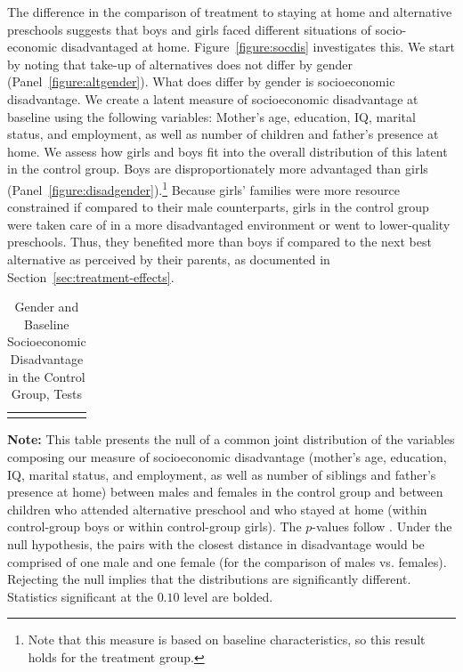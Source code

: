 The difference in the comparison of treatment to staying at home and alternative preschools suggests that boys and girls faced different situations of socio-economic disadvantaged at home. Figure~\ref{figure:socdis} investigates this. We start by noting that take-up of alternatives does not differ by gender (Panel~\ref{figure:altgender}). What does differ by gender is socioeconomic disadvantage. We create a latent measure of socioeconomic disadvantage at baseline using the following variables: Mother's age, education, IQ, marital status, and employment, as well as number of children and father's presence at home. We assess how girls and boys fit into the overall distribution of this latent in the control group. Boys are disproportionately more advantaged than girls (Panel~\ref{figure:disadgender}).\footnote{Note that this measure is based on baseline characteristics, so this result holds for the treatment group.} Because girls' families were more resource constrained if compared to their male counterparts, girls in the control group were taken care of in a more disadvantaged environment or went to lower-quality preschools. Thus, they benefited more than boys if compared to the next best alternative as perceived by their parents, as documented in Section~\ref{sec:treatment-effects}.


\begin{table}[!htpb]
\begin{threeparttable}
\caption{Gender and Baseline Socioeconomic Disadvantage in the Control Group, Tests} \label{table:disadtests}
\centering 
\begin{tabularx}{16.5cm}{XcX}
&  & 
\end{tabularx}
\begin{tablenotes}
\footnotesize
\item \textbf{Note:} This table presents the null of a common joint distribution of the variables composing our measure of socioeconomic disadvantage (mother's age, education, IQ, marital status, and employment, as well as number of siblings and father's presence at home) between males and females in the control group and between children who attended  alternative preschool and who stayed at home (within control-group boys or within control-group girls). The $p$-values follow \citet{Rosenbaum_2005_Distribution_JRSS}. Under the null hypothesis, the pairs with the closest distance in disadvantage would be comprised of one male and one female (for the comparison of males vs. females). Rejecting the null implies that the distributions are significantly different. Statistics significant at the $0.10$ level are bolded.
\end{tablenotes}
\end{threeparttable}
\end{table}

